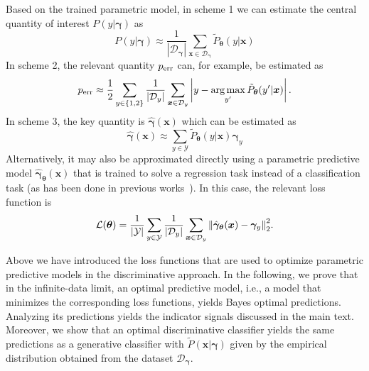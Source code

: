 \documentclass[twocolumn,aps,pra,superscriptaddress,tightlines,nofootinbib]{revtex4-2}
\DeclareMathOperator*{\argmax}{arg\,max}
\begin{document}
	Based on the trained parametric model, in scheme 1 we can estimate the central quantity of interest $P(y|\bm{\gamma})$ as 
	\begin{equation}\label{eq:SL_1}
		P(y|\bm{\gamma}) \approx \frac{1}{|\mathcal{D}_{\bm{\gamma}}|}\sum_{\bm{x} \in \mathcal{D}_{\bm{\gamma}}} \tilde{P}_{\bm{\theta}}(y|\bm{x})
	\end{equation}
	In scheme 2, the relevant quantity $p_{\rm err}$ can, for example, be estimated as
	\begin{equation}\label{eq:LBC_err_SI}
		p_{\rm err} \approx \frac{1}{2}\sum_{y \in \{1,2 \}} \frac{1}{|\mathcal{D}_{y}|}\sum_{\bm{x} \in \mathcal{D}_{y}} \left|y- \argmax_{y'} \tilde{P}_{\bm{\theta}}(y'|\bm{x})\right|.
	\end{equation}
	In scheme 3, the key quantity is $\hat{\bm{\gamma}}(\bm{x})$ which can be estimated as
	\begin{equation}\label{eq:PBM_pred_SI}
		\hat{\bm{\gamma}}(\bm{x}) \approx \sum_{y \in \mathcal{Y}} \tilde{P}_{\bm{\theta}}(y|\bm{x})\bm{\gamma}_{y}
	\end{equation}
	Alternatively, it may also be approximated directly using a parametric predictive model $\hat{\bm{\gamma}}_{\bm{\theta}}(\bm{x})$ that is trained to solve a regression task instead of a classification task (as has been done in previous works~\cite{schaefer:2019,greplova:2020,arnold:2021,arnold:2022}). In this case, the relevant loss function is
	\begin{equation}\label{eq:SI_x2}
		\mathcal{L}(\bm{\theta}) = \frac{1}{|\mathcal{Y}|} \sum_{y \in \mathcal{Y}} \frac{1}{|\mathcal{D}_{y}|} \sum_{\bm{x} \in \mathcal{D}_{y}}  \norm{\hat{\bm{\gamma}}_{\bm{\theta}}(\bm{x}) - \bm{\gamma}_{y}}_{2}^2.
	\end{equation}
	
	Above we have introduced the loss functions that are used to optimize parametric predictive models in the discriminative approach. In the following, we prove that in the infinite-data limit, an optimal predictive model, i.e., a model that minimizes the corresponding loss functions, yields Bayes optimal predictions. Analyzing its predictions yields the indicator signals discussed in the main text. Moreover, we show that an optimal discriminative classifier yields the same predictions as a generative classifier with $\tilde{P}(\bm{x}|\bm{\gamma})$ given by the empirical distribution obtained from the dataset $\mathcal{D}_{\bm{\gamma}}$.\\
	
\end{document}
